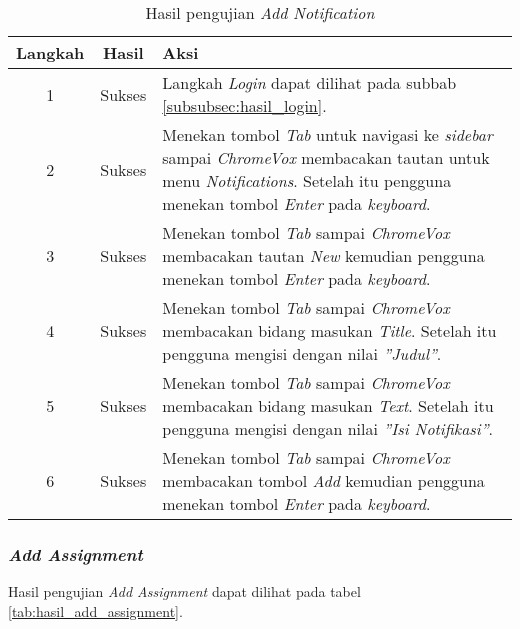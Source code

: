 \begin{table}[H]
	\centering
	\caption{Hasil pengujian \textit{Add Notification}}
	\label{tab:hasil_add_notification}
	\begin{tabular}{|c|c|p{12cm}|}
		\toprule
		Langkah & Hasil & Aksi\\
		\midrule
		1 & Sukses & Langkah \textit{Login} dapat dilihat pada subbab \ref{subsubsec:hasil_login}.\\
		2 & Sukses & Menekan tombol \textit{Tab} untuk navigasi ke \textit{sidebar} sampai \textit{ChromeVox} membacakan tautan untuk menu \textit{Notifications}. Setelah itu pengguna menekan tombol \textit{Enter} pada \textit{keyboard}.\\
		3 & Sukses & Menekan tombol \textit{Tab} sampai \textit{ChromeVox} membacakan tautan \textit{New} kemudian pengguna menekan tombol \textit{Enter} pada \textit{keyboard}.\\
		4 & Sukses & Menekan tombol \textit{Tab} sampai \textit{ChromeVox} membacakan bidang masukan \textit{Title}. Setelah itu pengguna mengisi dengan nilai \textit{''Judul''}.\\
		5 & Sukses & Menekan tombol \textit{Tab} sampai \textit{ChromeVox} membacakan bidang masukan \textit{Text}. Setelah itu pengguna mengisi dengan nilai \textit{''Isi Notifikasi''}.\\
		6 & Sukses & Menekan tombol \textit{Tab} sampai \textit{ChromeVox} membacakan tombol \textit{Add} kemudian pengguna menekan tombol \textit{Enter} pada \textit{keyboard}.\\
		\bottomrule
	\end{tabular}
\end{table}

\subsubsection{\textit{Add Assignment}}
\label{subsubsec:hasil_add_assignment}
Hasil pengujian \textit{Add Assignment} dapat dilihat pada tabel \ref{tab:hasil_add_assignment}.

